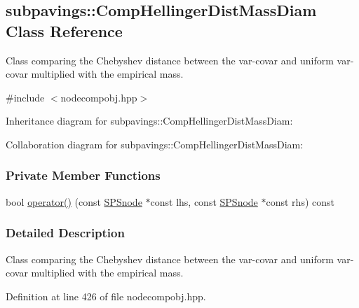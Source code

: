 \hypertarget{classsubpavings_1_1CompHellingerDistMassDiam}{\subsection{subpavings\-:\-:\-Comp\-Hellinger\-Dist\-Mass\-Diam \-Class \-Reference}
\label{classsubpavings_1_1CompHellingerDistMassDiam}
}


\-Class comparing the \-Chebyshev distance between the var-\/covar and uniform var-\/covar multiplied with the empirical mass.  




{\ttfamily \#include $<$nodecompobj.\-hpp$>$}



\-Inheritance diagram for subpavings\-:\-:\-Comp\-Hellinger\-Dist\-Mass\-Diam\-:


\-Collaboration diagram for subpavings\-:\-:\-Comp\-Hellinger\-Dist\-Mass\-Diam\-:
\subsubsection*{\-Private \-Member \-Functions}
\begin{DoxyCompactItemize}
\item 
bool \hyperlink{classsubpavings_1_1CompHellingerDistMassDiam_a45fc3314836372332027716de71698b5}{operator()} (const \hyperlink{classsubpavings_1_1SPSnode}{\-S\-P\-Snode} $\ast$const lhs, const \hyperlink{classsubpavings_1_1SPSnode}{\-S\-P\-Snode} $\ast$const rhs) const 
\end{DoxyCompactItemize}


\subsubsection{\-Detailed \-Description}
\-Class comparing the \-Chebyshev distance between the var-\/covar and uniform var-\/covar multiplied with the empirical mass. 

\-Definition at line 426 of file nodecompobj.\-hpp.




